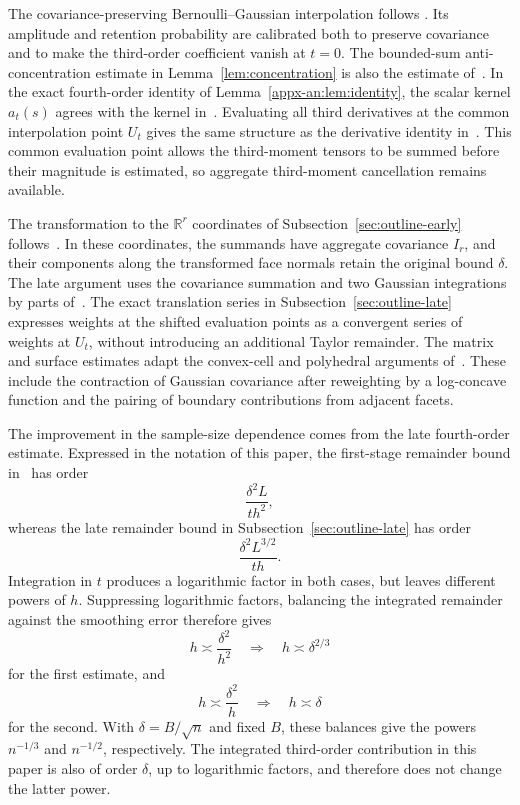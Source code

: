 \documentclass[11pt,letterpaper]{article}
\theoremstyle{remark}
\newcommand{\R}{\mathbb R}
\begin{document}
The covariance-preserving Bernoulli--Gaussian interpolation follows
\cite[Section~4]{AL}. Its amplitude and retention probability are
calibrated both to preserve covariance and to make the third-order
coefficient vanish at \(t=0\). The bounded-sum anti-concentration
estimate in Lemma~\ref{lem:concentration} is also the estimate
of~\cite[Lemma~2.1]{AL}. In the exact fourth-order identity of
Lemma~\ref{appx-an:lem:identity}, the scalar kernel \(a_t(s)\)
agrees with the kernel in~\cite[Lemma~4.1]{AL}. Evaluating all
third derivatives at the common interpolation point \(U_t\) gives
the same structure as the derivative identity
in~\cite[Lemma~22]{GaoZhang}. This common evaluation point allows
the third-moment tensors to be summed before their magnitude is
estimated, so aggregate third-moment cancellation remains available.

The transformation to the \(\R^r\) coordinates of
Subsection~\ref{sec:outline-early} follows~\cite[Section~2.3]{GaoZhang}.
In these coordinates, the summands have aggregate covariance \(I_r\),
and their components along the transformed face normals retain the
original bound \(\delta\). The late argument uses the covariance
summation and two Gaussian integrations by parts
of~\cite[Lemma~23]{GaoZhang}. The exact translation series in
Subsection~\ref{sec:outline-late} expresses weights at the shifted
evaluation points as a convergent series of weights at \(U_t\),
without introducing an additional Taylor remainder. The matrix and
surface estimates adapt the convex-cell and polyhedral arguments
of~\cite[Lemma~12 and Proposition~4]{GaoZhang}. These include the
contraction of Gaussian covariance after reweighting by a log-concave
function and the pairing of boundary contributions from adjacent
facets.

The improvement in the sample-size dependence comes from the late
fourth-order estimate. Expressed in the notation of this paper, the
first-stage remainder bound in~\cite[Proposition~2]{GaoZhang} has order
\[
 \frac{\delta^2L}{th^2},
\]
whereas the late remainder bound in
Subsection~\ref{sec:outline-late} has order
\[
 \frac{\delta^2L^{3/2}}{th}.
\]
Integration in \(t\) produces a logarithmic factor in both cases,
but leaves different powers of \(h\). Suppressing logarithmic
factors, balancing the integrated remainder against the smoothing
error therefore gives
\[
 h\asymp\frac{\delta^2}{h^2}
 \quad\Longrightarrow\quad h\asymp\delta^{2/3}
\]
for the first estimate, and
\[
 h\asymp\frac{\delta^2}{h}
 \quad\Longrightarrow\quad h\asymp\delta
\]
for the second. With \(\delta=B/\sqrt n\) and fixed \(B\), these
balances give the powers \(n^{-1/3}\) and \(n^{-1/2}\), respectively.
The integrated third-order contribution in this paper is also of
order \(\delta\), up to logarithmic factors, and therefore does
not change the latter power.
\end{document}
